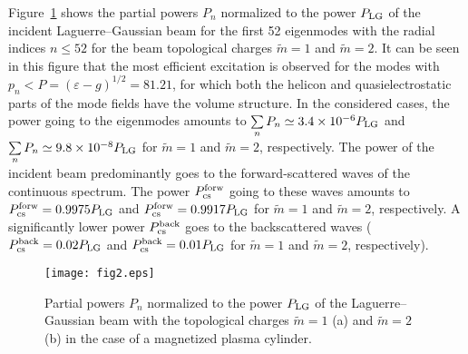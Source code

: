\documentclass[conference,a4paper]{IEEEtran}
\begin{document}
Figure~\ref{fig2} shows the partial powers $P_n$ normalized to the power $P_{\rm LG}$ of the incident Laguerre--Gaussian beam for the first 52 eigenmodes with the radial indices $n\leq 52$ for the beam topological charges $\tilde{m}=1$ and $\tilde{m}=2$. It can be seen in this figure that the most efficient excitation is observed for the modes with $ p_n<P=(\varepsilon-g)^{1/2}=81{.}21$, for which both the helicon and quasielectrostatic parts of the mode fields have the volume structure. In the considered cases, the power going to the eigenmodes amounts to $\sum\limits_{n}P_n\simeq3.4\times 10^{-6} P_{\rm LG}$ and $\sum\limits_{n}P_n\simeq9.8\times 10^{-8} P_{\rm LG}$ for $\tilde{m}=1$ and $\tilde{m}=2$, respectively. The power of the incident beam predominantly goes to the forward-scattered waves of the continuous spectrum. The power $P_{\rm cs}^{\rm forw}$ going to these waves amounts to $P_{\rm cs}^{\rm forw} = 0{.}9975 P_{\rm LG}$ and $P_{\rm cs}^{\rm forw} = 0{.}9917 P_{\rm LG}$ for $\tilde{m}=1$ and $\tilde{m}=2$, respectively. A significantly lower power $P_{\rm cs}^{\rm back}$ goes to the backscattered waves ($P_{\rm cs}^{\rm back} = 0{.}02 P_{\rm LG}$ and $P_{\rm cs}^{\rm back} = 0{.}01 P_{\rm LG}$ for $\tilde{m}=1$ and $\tilde{m}=2$, respectively).


\begin{figure}[h]
	\texttt{[image: fig2.eps]}
	\caption{Partial powers $P_n$ normalized to the power $P_{\rm LG}$ of the Laguerre--Gaussian beam with the topological charges $\tilde{m}=1$ (a) and $\tilde{m}=2$ (b) in the case of a magnetized plasma cylinder.} \label{fig2}
\end{figure}


\end{document}
